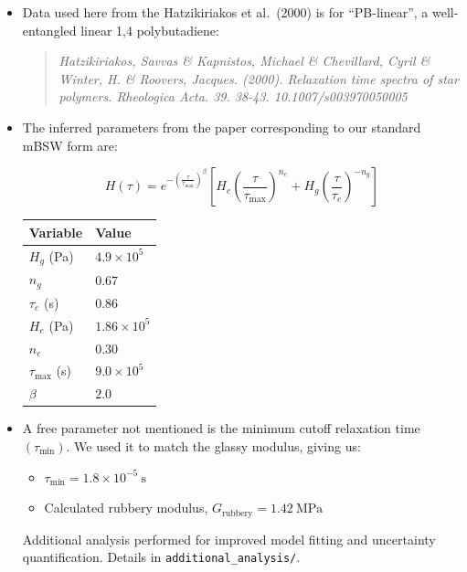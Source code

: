 \documentclass[a4paper, 12pt]{article}
\begin{document}
\begin{itemize}

\item Data used here from the Hatzikiriakos et al.~(2000) is for
``PB-linear'', a well-entangled linear 1,4 polybutadiene:
\begin{quote}
\textit{Hatzikiriakos, Savvas \& Kapnistos, Michael \&
Chevillard, Cyril \& Winter, H. \& Roovers, Jacques. (2000).
Relaxation time spectra of star polymers. Rheologica Acta. 39. 38-43.
10.1007/s003970050005}
\end{quote}
\item The inferred parameters from the paper corresponding to our standard
mBSW form are:

\[
H(\tau) = e^{-\left(\frac{\tau}{\tau_{\max}}\right)^\beta} 
\left[ H_e \left( \frac{\tau}{\tau_{\max}} \right)^{n_e} + 
H_g \left( \frac{\tau}{\tau_e} \right)^{-n_g} \right]
\]

\begin{table}[htbp]
    \centering
    \begin{tabular}{ll}
        \toprule
        \textbf{Variable} & \textbf{Value} \\
        \midrule
        \(H_g\) (Pa)  & \(4.9 \times 10^5\) \\
        \(n_g\)       & \(0.67\) \\
        \(\tau_e\) (s) & \(0.86\) \\
        \(H_e\) (Pa)  & \(1.86 \times 10^5\) \\
        \(n_e\)       & \(0.30\) \\
        \(\tau_{\max}\) (s) & \(9.0 \times 10^5\) \\
        \(\beta\)     & \(2.0\) \\
        \bottomrule
    \end{tabular}
    \label{tab:parameters}
\end{table}

\item A free parameter not mentioned is the minimum cutoff relaxation time
\((\tau_{\text{min}})\). We used it to match the glassy modulus,
giving us:

\begin{itemize}
  \item \(\tau_{\text{min}} = 1.8\times 10^{-5}~\text{s}\)
  \item Calculated rubbery modulus, \(G_{\text{rubbery}} = 1.42~\text{MPa}\)
\end{itemize}

Additional analysis performed for improved model fitting and
uncertainty quantification. Details in \texttt{additional\_analysis/}.


\end{itemize}
\end{document}
